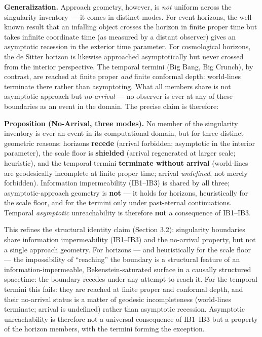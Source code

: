 \documentclass[
]{article}
\begin{document}
\textbf{Generalization.} Approach geometry, however, is \emph{not}
uniform across the singularity inventory --- it comes in distinct modes.
For event horizons, the well-known result that an infalling object
crosses the horizon in finite proper time but takes infinite coordinate
time (as measured by a distant observer) gives an asymptotic recession
in the exterior time parameter. For cosmological horizons, the de Sitter
horizon is likewise approached asymptotically but never crossed from the
interior perspective. The temporal termini (Big Bang, Big Crunch), by
contrast, are reached at finite proper \emph{and} finite conformal
depth: world-lines terminate there rather than asymptoting. What all
members share is not asymptotic approach but \emph{no-arrival} --- no
observer is ever at any of these boundaries as an event in the domain.
The precise claim is therefore:

\textbf{Proposition (No-Arrival, three modes).} No member of the
singularity inventory is ever an event in its computational domain, but
for three distinct geometric reasons: horizons \textbf{recede} (arrival
forbidden; asymptotic in the interior parameter), the scale floor is
\textbf{shielded} (arrival regenerated at larger scale; heuristic), and
the temporal termini \textbf{terminate without arrival} (world-lines are
geodesically incomplete at finite proper time; arrival \emph{undefined},
not merely forbidden). Information impermeability (IB1--IB3) is shared
by all three; asymptotic-approach geometry is \textbf{not} --- it holds
for horizons, heuristically for the scale floor, and for the termini
only under past-eternal continuations. Temporal \emph{asymptotic}
unreachability is therefore \textbf{not} a consequence of IB1--IB3.

This refines the structural identity claim (Section 3.2): singularity
boundaries share information impermeability (IB1--IB3) and the
no-arrival property, but not a single approach geometry. For horizons
--- and heuristically for the scale floor --- the impossibility of
``reaching'' the boundary is a structural feature of an
information-impermeable, Bekenstein-saturated surface in a causally
structured spacetime: the boundary recedes under any attempt to reach
it. For the temporal termini this fails: they are reached at finite
proper and conformal depth, and their no-arrival status is a matter of
geodesic incompleteness (world-lines terminate; arrival is undefined)
rather than asymptotic recession. Asymptotic unreachability is therefore
not a universal consequence of IB1--IB3 but a property of the horizon
members, with the termini forming the exception.
\end{document}
